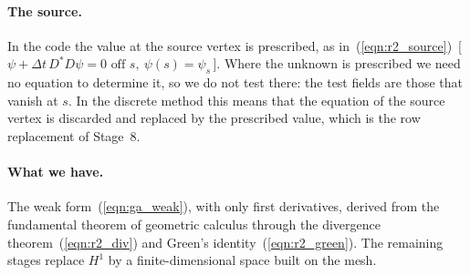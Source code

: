 \paragraph{The source.} In the code the value at the source vertex is prescribed, as in~(\ref{eqn:r2_source})~[\,$\psi + \Delta t\, D^*D\psi = 0 \text{ off } s,\ \psi(s) = \psi_s$\,]. Where the unknown is prescribed we need no equation to determine it, so we do not test there: the test fields are those that vanish at $s$. In the discrete method this means that the equation of the source vertex is discarded and replaced by the prescribed value, which is the row replacement of Stage~8.

\paragraph{What we have.} The weak form~(\ref{eqn:ga_weak}), with only first derivatives, derived from the fundamental theorem of geometric calculus through the divergence theorem~(\ref{eqn:r2_div}) and Green's identity~(\ref{eqn:r2_green}). The remaining stages replace $H^1$ by a finite-dimensional space built on the mesh.

